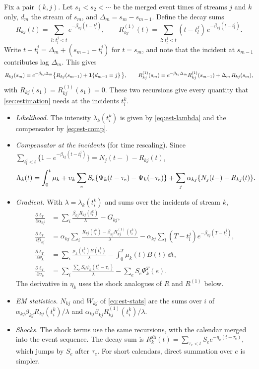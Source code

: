 Fix a pair $(k,j)$. Let $s_1<s_2<\cdots$ be the merged event times of streams $j$ and
$k$ only, $d_m$ the stream of $s_m$, and $\Delta_m=s_m-s_{m-1}$. Define the decay sums
\[
  R_{kj}(t)=\sum_{l:\,t^j_l<t}e^{-\beta_{kj}(t-t^j_l)},\qquad
  R^{(1)}_{kj}(t)=\sum_{l:\,t^j_l<t}(t-t^j_l)\,e^{-\beta_{kj}(t-t^j_l)} .
\]
Write $t-t^j_l=\Delta_m+(s_{m-1}-t^j_l)$ for $t=s_m$, and note that the incident at
$s_{m-1}$ contributes lag $\Delta_m$. This gives
\begin{equation}\label{eq:app-rec}
  R_{kj}(s_m)=e^{-\beta_{kj}\Delta_m}\big\{R_{kj}(s_{m-1})+\mathbf{1}\!\left\{d_{m-1}=j\right\}\big\},\qquad
  R^{(1)}_{kj}(s_m)=e^{-\beta_{kj}\Delta_m}R^{(1)}_{kj}(s_{m-1})+\Delta_m\,R_{kj}(s_m),
\end{equation}
with $R_{kj}(s_1)=R^{(1)}_{kj}(s_1)=0$. These two recursions give every quantity that
\cref{sec:estimation} needs at the incidents $t^k_i$.
\begin{itemize}
  \item \emph{Likelihood.} The intensity $\lambda_k(t^k_i)$ is given by
    \eqref{eq:est-lambda} and the compensator by \eqref{eq:est-comp}.
  \item \emph{Compensator at the incidents} (for time rescaling). Since
    $\sum_{t^j_l<t}\{1-e^{-\beta_{kj}(t-t^j_l)}\}=N_j(t-)-R_{kj}(t)$,
    \[
      \Lambda_k(t)=\int_0^t\mu_k+\upsilon_k\sum_eS_e\{\Psi_k(t-\tau_e)-\Psi_k(-\tau_e)\}
      +\sum_j\alpha_{kj}\{N_j(t-)-R_{kj}(t)\}.
    \]
  \item \emph{Gradient.} With $\lambda=\lambda_k(t^k_i)$ and sums over the incidents of
    stream $k$,
    \begin{align*}
      \frac{\partial\ell_T}{\partial\alpha_{kj}}&=\sum_i\frac{\beta_{kj}R_{kj}(t^k_i)}{\lambda}-G_{kj},\\
      \frac{\partial\ell_T}{\partial\beta_{kj}}&=\alpha_{kj}\sum_i\frac{R_{kj}(t^k_i)-\beta_{kj}R^{(1)}_{kj}(t^k_i)}{\lambda}
        -\alpha_{kj}\sum_l(T-t^j_l)e^{-\beta_{kj}(T-t^j_l)},\\
      \frac{\partial\ell_T}{\partial\theta_k}&=\sum_i\frac{\mu_k(t^k_i)B(t^k_i)}{\lambda}-\int_0^T\mu_k(t)B(t)\,\dd t,\\
      \frac{\partial\ell_T}{\partial\upsilon_k}&=\sum_i\frac{\sum_eS_e\psi_k(t^k_i-\tau_e)}{\lambda}-\sum_eS_e\Psi^T_k(e).
    \end{align*}
    The derivative in $\eta_k$ uses the shock analogues of $R$ and $R^{(1)}$ below.
  \item \emph{EM statistics.} $N_{kj}$ and $W_{kj}$ of \eqref{eq:est-stats} are the sums
    over $i$ of $\alpha_{kj}\beta_{kj}R_{kj}(t^k_i)/\lambda$ and
    $\alpha_{kj}\beta_{kj}R^{(1)}_{kj}(t^k_i)/\lambda$.
  \item \emph{Shocks.} The shock terms use the same recursions, with the calendar merged
    into the event sequence. The decay sum is
    $R^{\mathrm{sh}}_k(t)=\sum_{\tau_e<t}S_ee^{-\eta_k(t-\tau_e)}$, which jumps by $S_e$
    after $\tau_e$. For short calendars, direct summation over $e$ is simpler.
\end{itemize}

